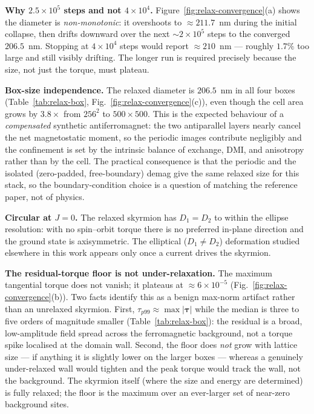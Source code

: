 \documentclass[11pt,a4paper]{article}
\newcommand{\mb}[1]{\mathbf{#1}}
\begin{document}
\textbf{Why $2.5\times10^{5}$ steps and not $4\times10^{4}$.}
Figure~\ref{fig:relax-convergence}(a) shows the diameter is
\emph{non-monotonic}: it overshoots to $\approx 211.7$~nm during the
initial collapse, then drifts downward over the next
$\sim 2\times10^{5}$ steps to the converged $206.5$~nm. Stopping at
$4\times10^{4}$ steps would report $\approx 210$~nm --- roughly
$1.7\%$ too large and still visibly drifting. The longer run is
required precisely because the size, not just the torque, must
plateau.

\textbf{Box-size independence.} The relaxed diameter is $206.5$~nm in
all four boxes (Table~\ref{tab:relax-box},
Fig.~\ref{fig:relax-convergence}(c)), even though the cell area grows
by $3.8\times$ from $256^2$ to $500\times500$. This is the expected
behaviour of a \emph{compensated} synthetic antiferromagnet: the two
antiparallel layers nearly cancel the net magnetostatic moment, so the
periodic images contribute negligibly and the confinement is set by the
intrinsic balance of exchange, DMI, and anisotropy rather than by the
cell. The practical consequence is that the periodic and the isolated
(zero-padded, free-boundary) demag give the same relaxed size for this
stack, so the boundary-condition choice is a question of matching the
reference paper, not of physics.

\textbf{Circular at $J=0$.} The relaxed skyrmion has $D_1=D_2$ to
within the ellipse resolution: with no spin--orbit torque there is no
preferred in-plane direction and the ground state is axisymmetric. The
elliptical ($D_1\neq D_2$) deformation studied elsewhere in this work
appears only once a current drives the skyrmion.

\textbf{The residual-torque floor is not under-relaxation.} The
maximum tangential torque does not vanish; it plateaus at
$\approx 6\times10^{-5}$ (Fig.~\ref{fig:relax-convergence}(b)). Two
facts identify this as a benign max-norm artifact rather than an
unrelaxed skyrmion. First, $\tau_{p99}\approx\max|\mb{\tau}|$ while the
median is three to five orders of magnitude smaller
(Table~\ref{tab:relax-box}): the residual is a broad, low-amplitude
field spread across the ferromagnetic background, not a torque spike
localised at the domain wall. Second, the floor does \emph{not} grow
with lattice size --- if anything it is slightly lower on the larger
boxes --- whereas a genuinely under-relaxed wall would tighten and the
peak torque would track the wall, not the background. The skyrmion
itself (where the size and energy are determined) is fully relaxed; the
floor is the maximum over an ever-larger set of near-zero background
sites.
\end{document}
